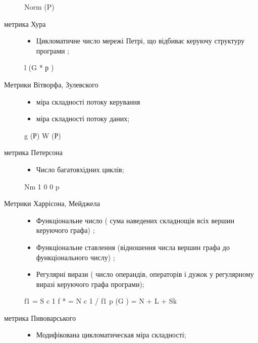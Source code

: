 \begin{description}
\begin{itemize}
\end{itemize}

Norm (P)

\item[{метрика Хура}] \leavevmode\begin{itemize}
\item {} 
Цикломатичне число мережі Петрі, що відбиває керуючу структуру програми ;

\end{itemize}

l (G * р )

\item[{Метрики Вітворфа, Зулевского}] \leavevmode\begin{itemize}
\item {} 
міра складності потоку керування

\item {} 
міра складності потоку даних;

\end{itemize}

g (Р)
W (Р)

\item[{метрика Петерсона}] \leavevmode\begin{itemize}
\item {} 
Число багатовхідних циклів;

\end{itemize}

Nm 1 0 0 p

\item[{Метрики Харрісона, Мейджела}] \leavevmode\begin{itemize}
\item {} 
Функціональне число ( сума наведених складнощів всіх вершин керуючого графа) ;

\item {} 
Функціональне ставлення (відношення числа вершин графа до функціонального числу) ;

\item {} 
Регулярні вирази ( число операндів, операторів і дужок у регулярному виразі керуючого графа програми);

\end{itemize}

f1 = S c 1
f * = N c 1 / f1
p (G ) = N + L + Sk

\item[{метрика Пивоварського}] \leavevmode\begin{itemize}
\item {} 
Модифікована цикломатическая міра складності;


\end{itemize}
\end{description}
